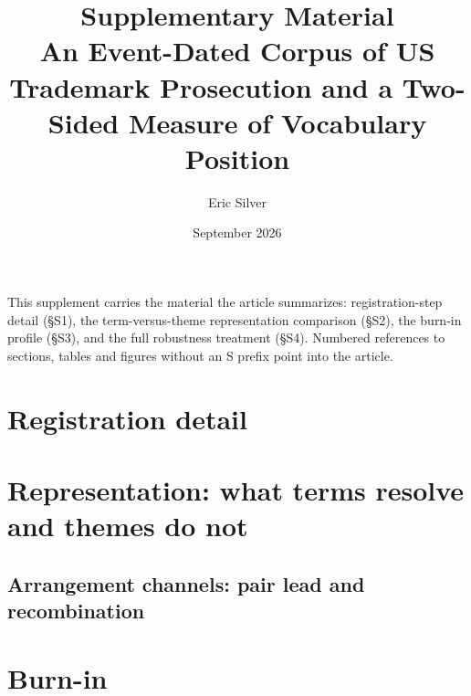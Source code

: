 
\usepackage{xr}

\newcommand{\onlineappendixnote}{\url{https://aporia.institute/tm-vocabulary/online-appendix/themes_T50.html}}
\graphicspath{{../../}}
\makeatletter{}\makeatother
\renewcommand{\thesection}{S\arabic{section}}
\renewcommand{\thetable}{S\arabic{table}}
\renewcommand{\thefigure}{S\arabic{figure}}
\title{\bfseries Supplementary Material\\
\large An Event-Dated Corpus of US Trademark Prosecution and a Two-Sided
Measure of Vocabulary Position}
\author{Eric Silver}
\date{September 2026}

\usepackage{placeins}

\maketitle

\noindent This supplement carries the material the article summarizes:
registration-step detail (\S S1), the term-versus-theme representation
comparison (\S S2), the burn-in profile (\S S3), and the full robustness
treatment (\S S4). Numbered references to sections, tables and figures
without an S prefix point into the article.

\section{Registration detail}\label{ssec:registration}




\section{Representation: what terms resolve and themes do not}\label{ssec:representation}

\subsection{Arrangement channels: pair lead and recombination}


\section{Burn-in}\label{ssec:burnin}




\FloatBarrier


